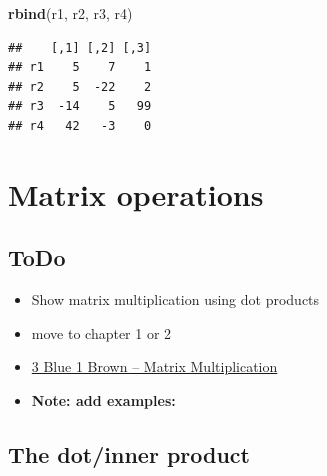 \documentclass[
]{book}
\newenvironment{Shaded}{\begin{snugshade}}{\end{snugshade}}
\newcommand{\KeywordTok}[1]{\textcolor[rgb]{0.13,0.29,0.53}{\textbf{#1}}}
\newcommand{\NormalTok}[1]{#1}
\theoremstyle{definition}
\theoremstyle{definition}
\theoremstyle{definition}
\theoremstyle{definition}
\theoremstyle{remark}
\begin{document}
\begin{Shaded}
\begin{Highlighting}[]
\KeywordTok{rbind}\NormalTok{(r1, r2, r3, r4)}
\end{Highlighting}
\end{Shaded}

\begin{verbatim}
##    [,1] [,2] [,3]
## r1    5    7    1
## r2    5  -22    2
## r3  -14    5   99
## r4   42   -3    0
\end{verbatim}

\hypertarget{matrix-operations}{%
\chapter{Matrix operations}\label{matrix-operations}}

\hypertarget{todo}{%
\section{ToDo}\label{todo}}

\begin{itemize}
\item
  Show matrix multiplication using dot products
\item
  move to chapter 1 or 2
\item
  \href{https://www.3blue1brown.com/lessons/matrix-multiplication}{3 Blue 1 Brown -- Matrix Multiplication}
\item
  \textbf{Note: add examples:}
\end{itemize}

\hypertarget{the-dotinner-product}{%
\section{The dot/inner product}\label{the-dotinner-product}}
\end{document}
